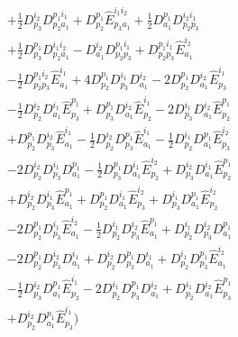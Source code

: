 \documentclass[aip,onecolumn,preprint]{revtex4-1}
\begin{document}
\begin{align}
  & + {{{\frac{1}{2}}}{D^{{i_2}}_{{p_3}}}{D^{{p_1}{i_1}}_{{p_2}{a_1}}}} + {{D^{{p_1}}_{{p_2}}}{\hat{E}^{{i_1}{i_2}}_{{p_3}{a_1}}}} + {{{\frac{1}{2}}}{D^{{p_1}}_{{a_1}}}{D^{{i_2}{i_1}}_{{p_2}{p_3}}}} \nonumber \\
  & + {{{\frac{1}{2}}}{D^{{p_1}}_{{p_3}}}{D^{{i_1}{i_2}}_{{p_2}{a_1}}}} - {{D^{{i_2}}_{{a_1}}}{D^{{p_1}{i_1}}_{{p_2}{p_3}}}} + {{D^{{p_1}{i_1}}_{{p_2}{p_3}}}{\hat{E}^{{i_2}}_{{a_1}}}} \nonumber \\
  & - {{{\frac{1}{2}}}{D^{{p_1}{i_2}}_{{p_2}{p_3}}}{\hat{E}^{{i_1}}_{{a_1}}}} + {{{4}}{D^{{p_1}}_{{p_2}}}{D^{{i_1}}_{{p_3}}}{D^{{i_2}}_{{a_1}}}} - {{{2}}{D^{{p_1}}_{{p_2}}}{D^{{i_2}}_{{a_1}}}{\hat{E}^{{i_1}}_{{p_3}}}} \nonumber \\
  & - {{{\frac{1}{2}}}{D^{{i_2}}_{{p_2}}}{D^{{i_1}}_{{a_1}}}{\hat{E}^{{p_1}}_{{p_3}}}} 
 + {{D^{{p_1}}_{{p_3}}}{D^{{i_2}}_{{a_1}}}{\hat{E}^{{i_1}}_{{p_2}}}} - {{{2}}{D^{{i_1}}_{{p_3}}}{D^{{i_2}}_{{a_1}}}{\hat{E}^{{p_1}}_{{p_2}}}} \nonumber \\
  & + {{D^{{p_1}}_{{p_2}}}{D^{{i_2}}_{{p_3}}}{\hat{E}^{{i_1}}_{{a_1}}}} - {{{\frac{1}{2}}}{D^{{i_2}}_{{p_2}}}{D^{{p_1}}_{{p_3}}}{\hat{E}^{{i_1}}_{{a_1}}}} - {{{\frac{1}{2}}}{D^{{i_1}}_{{p_2}}}{D^{{p_1}}_{{a_1}}}{\hat{E}^{{i_2}}_{{p_3}}}} \nonumber \\
  & - {{{2}}{D^{{i_2}}_{{p_2}}}{D^{{i_1}}_{{p_3}}}{D^{{p_1}}_{{a_1}}}} - {{{\frac{1}{2}}}{D^{{p_1}}_{{p_3}}}{D^{{i_1}}_{{a_1}}}{\hat{E}^{{i_2}}_{{p_2}}}} + {{D^{{i_2}}_{{p_3}}}{D^{{i_1}}_{{a_1}}}{\hat{E}^{{p_1}}_{{p_2}}}} \nonumber \\
  & + {{D^{{i_2}}_{{p_2}}}{D^{{i_1}}_{{p_3}}}{\hat{E}^{{p_1}}_{{a_1}}}} + {{D^{{p_1}}_{{p_2}}}{D^{{i_1}}_{{a_1}}}{\hat{E}^{{i_2}}_{{p_3}}}} + {{D^{{i_1}}_{{p_3}}}{D^{{p_1}}_{{a_1}}}{\hat{E}^{{i_2}}_{{p_2}}}} \nonumber \\
  & - {{{2}}{D^{{p_1}}_{{p_2}}}{D^{{i_1}}_{{p_3}}}{\hat{E}^{{i_2}}_{{a_1}}}} - {{{\frac{1}{2}}}{D^{{i_1}}_{{p_2}}}{D^{{i_2}}_{{p_3}}}{\hat{E}^{{p_1}}_{{a_1}}}} + {{D^{{i_1}}_{{p_2}}}{D^{{i_2}}_{{p_3}}}{D^{{p_1}}_{{a_1}}}} \nonumber \\
  & - {{{2}}{D^{{p_1}}_{{p_2}}}{D^{{i_2}}_{{p_3}}}{D^{{i_1}}_{{a_1}}}} + {{D^{{i_2}}_{{p_2}}}{D^{{p_1}}_{{p_3}}}{D^{{i_1}}_{{a_1}}}} + {{D^{{i_1}}_{{p_2}}}{D^{{p_1}}_{{p_3}}}{\hat{E}^{{i_2}}_{{a_1}}}} \nonumber \\
  & - {{{\frac{1}{2}}}{D^{{i_2}}_{{p_3}}}{D^{{p_1}}_{{a_1}}}{\hat{E}^{{i_1}}_{{p_2}}}} - {{{2}}{D^{{i_1}}_{{p_2}}}{D^{{p_1}}_{{p_3}}}{D^{{i_2}}_{{a_1}}}} + {{D^{{i_1}}_{{p_2}}}{D^{{i_2}}_{{a_1}}}{\hat{E}^{{p_1}}_{{p_3}}}} \nonumber \\
  & + {{D^{{i_2}}_{{p_2}}}{D^{{p_1}}_{{a_1}}}{\hat{E}^{{i_1}}_{{p_3}}}} \bigg)
  \end{align}
\end{document}
